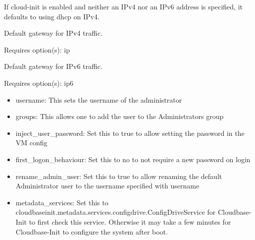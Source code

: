 If cloud-init is enabled and neither an IPv4 nor an IPv6 address is specified, it defaults to using dhcp on IPv4.

Default gateway for IPv4 traffic.

Requires option(s): ip

Default gateway for IPv6 traffic.

Requires option(s): ip6

\begin{itemize}[leftmargin=2cm]

	\item username: This sets the username of the administrator

	\item groups: This allows one to add the user to the Administrators group

	\item inject_user_password: Set this to true to allow setting the password in the VM config

	\item first_logon_behaviour: Set this to no to not require a new password on login

	\item rename_admin_user: Set this to true to allow renaming the default Administrator user to the username specified with username

	\item metadata_services: Set this to cloudbaseinit.metadata.services.configdrive.ConfigDriveService for Cloudbase-Init to first check this service. Otherwise it may take a few minutes for Cloudbase-Init to configure the system after boot.

\end{itemize}

